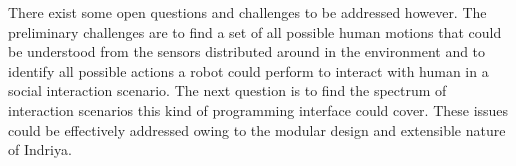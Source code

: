 There exist some open questions and challenges to be addressed however. The preliminary challenges are to find a set of all possible human motions that could be understood from the sensors distributed around in the environment and to identify all possible actions a robot could perform to interact with human in a social interaction scenario. The next question is to find the spectrum of interaction scenarios this kind of programming interface could cover. These issues could be effectively addressed owing to the modular design and extensible nature of Indriya.